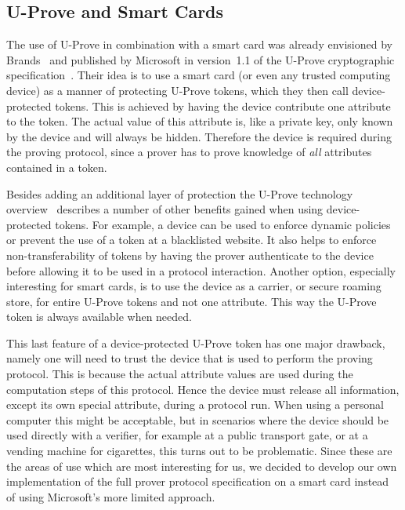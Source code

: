 \subsection{U-Prove and Smart Cards}\label{sec:uproveandcards}

The use of U-Prove in combination with a smart card was already envisioned by
Brands~\cite{Brands2000} and published by Microsoft in version~1.1 of the
U-Prove cryptographic specification~\cite{U-Prove_Crypto2011}. Their idea is to
use a smart card (or even any trusted computing device) as a manner of
protecting U-Prove tokens, which they then call device-protected tokens. This is
achieved by having the device contribute one attribute to the token. The actual
value of this attribute is, like a private key, only known by the device and
will always be hidden. Therefore the device is required during the proving
protocol, since a prover has to prove knowledge of \emph{all} attributes
contained in a token.

Besides adding an additional layer of protection the U-Prove technology
overview~\cite{U-Prove_Overview2011} describes a number of other benefits
gained when using device-protected tokens. For example, a device can be used to
enforce dynamic policies or prevent the use of a token at a blacklisted website.
It also helps to enforce non-transferability of tokens by having the prover
authenticate to the device before allowing it to be used in a protocol
interaction. Another option, especially interesting for smart cards, is to use
the device as a carrier, or secure roaming store, for entire U-Prove tokens and
not one attribute. This way the U-Prove token is always available when needed.

This last feature of a device-protected U-Prove token has one major drawback,
namely one will need to trust the device that is used to perform the proving
protocol. This is because the actual attribute values are used during the
computation steps of this protocol. Hence the device must release all
information, except its own special attribute, during a protocol run. When using
a personal computer this might be acceptable, but in scenarios where the device
should be used directly with a verifier, for example at a public transport gate,
or at a vending machine for cigarettes, this turns out to be problematic. Since
these are the areas of use which are most interesting for us, we decided to
develop our own implementation of the full prover protocol specification on a
smart card instead of using Microsoft's more limited approach.

